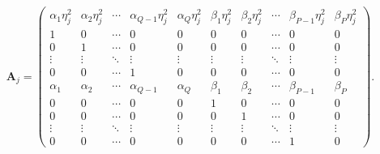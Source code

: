 \documentclass[10pt,a4paper,oneside]{article}
\begin{document}
\[
    \mathbf{A}_j =
    \begin{pmatrix}
        \alpha_1 \eta_j^2 & \alpha_2 \eta_j^2 & \cdots & \alpha_{Q - 1} \eta_j^2 & \alpha_Q \eta_j^2 & \beta_1 \eta_j^2 & \beta_2 \eta_j^2 & \cdots & \beta_{P - 1} \eta_j^2 & \beta_P \eta_j^2 \\
        1                 & 0                 & \cdots & 0                       & 0                 & 0                & 0                & \cdots & 0                      & 0                \\
        0                 & 1                 & \cdots & 0                       & 0                 & 0                & 0                & \cdots & 0                      & 0                \\
        \vdots            & \vdots            & \ddots & \vdots                  & \vdots            & \vdots           & \vdots           & \ddots & \vdots                 & \vdots           \\
        0                 & 0                 & \cdots & 1                       & 0                 & 0                & 0                & \cdots & 0                      & 0                \\
        \alpha_1          & \alpha_2          & \cdots & \alpha_{Q - 1}          & \alpha_Q          & \beta_1          & \beta_2          & \cdots & \beta_{P - 1}          & \beta_P          \\
        0                 & 0                 & \cdots & 0                       & 0                 & 1                & 0                & \cdots & 0                      & 0                \\
        0                 & 0                 & \cdots & 0                       & 0                 & 0                & 1                & \cdots & 0                      & 0                \\
        \vdots            & \vdots            & \ddots & \vdots                  & \vdots            & \vdots           & \vdots           & \ddots & \vdots                 & \vdots           \\
        0                 & 0                 & \cdots & 0                       & 0                 & 0                & 0                & \cdots & 1                      & 0
    \end{pmatrix}.
\]
\end{document}
